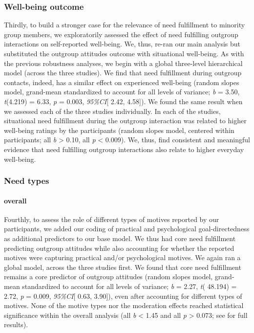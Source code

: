 \subsubsection{Well-being outcome}

Thirdly, to build a stronger case for the relevance of need fulfillment
to minority group members, we exploratorily assessed the effect of need
fulfilling outgroup interactions on self-reported well-being. We, thus,
re-ran our main analysis but substituted the outgroup attitudes outcome
with situational well-being. As with the previous robustness analyses,
we begin with a global three-level hierarchical model (across the three
studies). We find that need fulfillment during outgroup contacts,
indeed, has a similar effect on experienced well-being (random slopes
model, grand-mean standardized to account for all levels of variance;
\textit{b} = 3.50, \textit{t}(4.219) = 6.33, \textit{p} = 0.003,
\textit{95\%CI}{[} 2.42, 4.58{]}). We found the same result when we
assessed each of the three studies individually. In each of the studies,
situational need fulfillment during the outgroup interaction was related
to higher well-being ratings by the participants (random slopes model,
centered within participants; all \textbar{}\textit{b}\textbar{}
\textgreater{} 0.10, all \textit{p} \textless{} 0.009). We, thus, find
consistent and meaningful evidence that need fulfilling outgroup
interactions also relate to higher everyday well-being.

\subsubsection{Need types}

\paragraph{overall}

Fourthly, to assess the role of different types of motives reported by
our participants, we added our coding of practical and psychological
goal-directedness as additional predictors to our base model. We thus
had core need fulfillment predicting outgroup attitudes while also
accounting for whether the reported motives were capturing practical
and/or psychological motives. We again ran a global model, across the
three studies first. We found that core need fulfillment remains a core
predictor of outgroup attitudes (random slopes model, grand-mean
standardized to account for all levels of variance; \textit{b} = 2.27,
\textit{t}( 48.194) = 2.72, \textit{p} = 0.009, \textit{95\%CI}{[} 0.63,
3.90{]}), even after accounting for different types of motives. None of
the motive types nor the moderation effects reached statistical
significance within the overall analysis (all
\textbar{}\textit{b}\textbar{} \textless{} 1.45 and all \textit{p}
\textgreater{} 0.073; see  for full
results).

